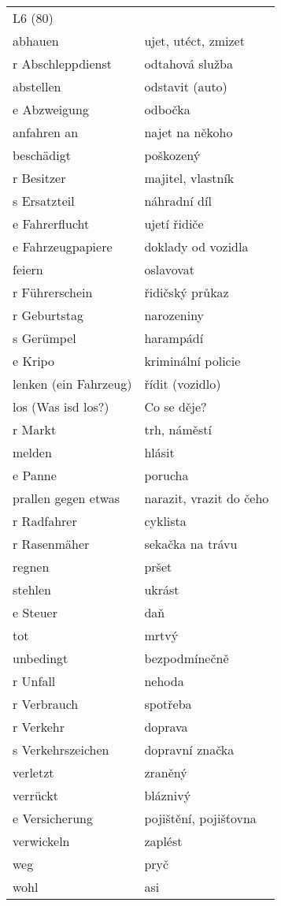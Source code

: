 \documentclass{article}
\begin{document}
\begin{tabular}{ p{5cm}|p{5cm}  }
    \\
    L6 (80) \\
    abhauen & ujet, utéct, zmizet\\
    r Abschleppdienst & odtahová služba\\
    abstellen & odstavit (auto)\\
    e Abzweigung & odbočka\\
    anfahren an & najet na někoho\\
    beschädigt & poškozený\\
    r Besitzer & majitel, vlastník\\
    s Ersatzteil & náhradní díl\\
    e Fahrerflucht & ujetí řidiče\\
    e Fahrzeugpapiere & doklady od vozidla\\
    feiern & oslavovat\\
    r Führerschein & řidičský průkaz\\
    r Geburtstag & narozeniny\\
    s Gerümpel & harampádí\\
    e Kripo & kriminální policie\\
    lenken (ein Fahrzeug) & řídit (vozidlo)\\
    los (Was isd los?) & Co se děje?\\
    r Markt & trh, náměstí\\
    melden & hlásit\\
    e Panne & porucha\\
    prallen gegen etwas & narazit, vrazit do čeho\\
    r Radfahrer & cyklista\\
    r Rasenmäher & sekačka na trávu\\
    regnen & pršet\\
    stehlen & ukrást\\
    e Steuer & daň\\
    tot & mrtvý\\
    unbedingt & bezpodmínečně\\
    r Unfall & nehoda\\
    r Verbrauch & spotřeba\\
    r Verkehr & doprava\\
    s Verkehrszeichen & dopravní značka\\
    verletzt & zraněný\\
    verrückt & bláznivý\\
    e Versicherung & pojištění, pojišťovna\\
    verwickeln & zaplést\\
    weg & pryč\\
    wohl & asi\\
\end{tabular}
\end{document}
